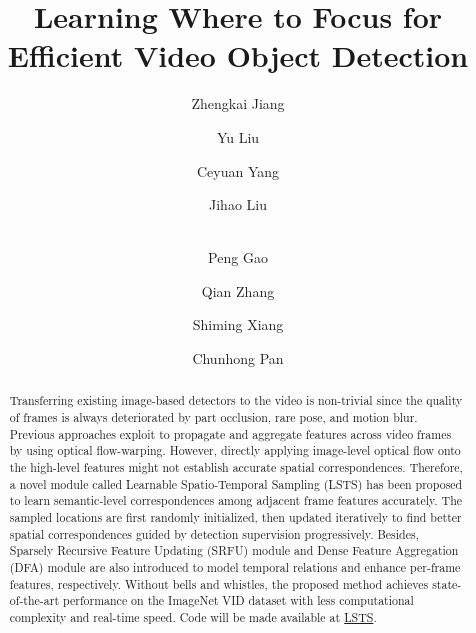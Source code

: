 \documentclass[runningheads]{llncs}
\begin{document}
\pagestyle{headings}
\mainmatter
\def\ECCVSubNumber{2475}

\title{Learning Where to Focus for Efficient Video Object Detection} 

\begin{comment}
\titlerunning{ECCV-20 submission ID \ECCVSubNumber} 
\authorrunning{ECCV-20 submission ID \ECCVSubNumber} 
\author{Anonymous ECCV submission}
\institute{Paper ID \ECCVSubNumber}
\end{comment}


\author{Zhengkai Jiang \and 
Yu Liu \and Ceyuan Yang \and
Jihao Liu \and \\ Peng Gao \and
Qian Zhang  \and
Shiming Xiang \and Chunhong Pan}
\maketitle
\begin{abstract}

Transferring existing image-based detectors to the video is non-trivial since the quality of frames is always deteriorated by part occlusion, rare pose, and motion blur. Previous approaches exploit to propagate and aggregate features across video frames by using optical flow-warping.  However, directly applying image-level optical flow onto the high-level features might not establish accurate spatial correspondences. Therefore, a novel module called Learnable Spatio-Temporal Sampling (LSTS) has been proposed to learn semantic-level correspondences among adjacent frame features accurately. The sampled locations are first randomly initialized, then updated iteratively to find better spatial correspondences guided by detection supervision progressively. Besides, Sparsely Recursive Feature Updating (SRFU) module and Dense Feature Aggregation (DFA) module are also introduced to model temporal relations and enhance per-frame features, respectively. Without bells and whistles, the proposed method achieves state-of-the-art performance on the ImageNet VID dataset with less computational complexity and real-time speed. Code will be made available at \href{https://github.com/jiangzhengkai/LSTS}{LSTS}.


\end{abstract}
\end{document}
